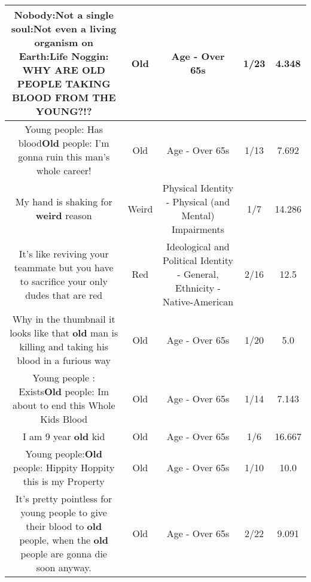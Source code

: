 \documentclass[11pt]{article}
\newlength\mylength
\begin{document}
\begin{center}
\begin{longtable}{|C{.65\mylength}|C{.30\mylength}|C{.12\mylength}|C{.12\mylength}|C{.12\mylength}|}
  \small Nobody:Not a single soul:Not even a living organism on Earth:Life Noggin: WHY ARE \textbf{OLD} PEOPLE TAKING BLOOD FROM THE YOUNG?!?\normalsize   & Old & Age - Over 65s & 1/23 & 4.348 \\  \hline
  \small Young people: Has blood\textbf{Old} people: I'm gonna ruin this man's whole career!\normalsize   & Old & Age - Over 65s & 1/13 & 7.692 \\  \hline
  \small My hand is shaking for \textbf{weird} reason\normalsize   & Weird & Physical Identity - Physical (and Mental) Impairments & 1/7 & 14.286 \\  \hline
  \small It's like reviving your teammate but you have to sacrifice your only dudes that are red\normalsize   & Red &  Ideological and Political Identity - General, Ethnicity - Native-American & 2/16 & 12.5 \\  \hline
  \small Why in the thumbnail it looks like that \textbf{old} man is killing and taking his blood in a furious way\normalsize   & Old & Age - Over 65s & 1/20 & 5.0 \\  \hline
  \small Young people : Exists\textbf{Old} people: Im about to end this Whole Kids Blood\normalsize   & Old & Age - Over 65s & 1/14 & 7.143 \\  \hline
  \small I am 9 year \textbf{old} kid\normalsize   & Old & Age - Over 65s & 1/6 & 16.667 \\  \hline
  \small Young people:\textbf{Old} people: Hippity Hoppity this is my Property\normalsize   & Old & Age - Over 65s & 1/10 & 10.0 \\  \hline
  \small It's pretty pointless for young people to give their blood to \textbf{old} people, when the \textbf{old} people are gonna die soon anyway.\normalsize   & Old & Age - Over 65s & 2/22 & 9.091 \\  \hline

\end{longtable}
\end{center}
\end{document}
